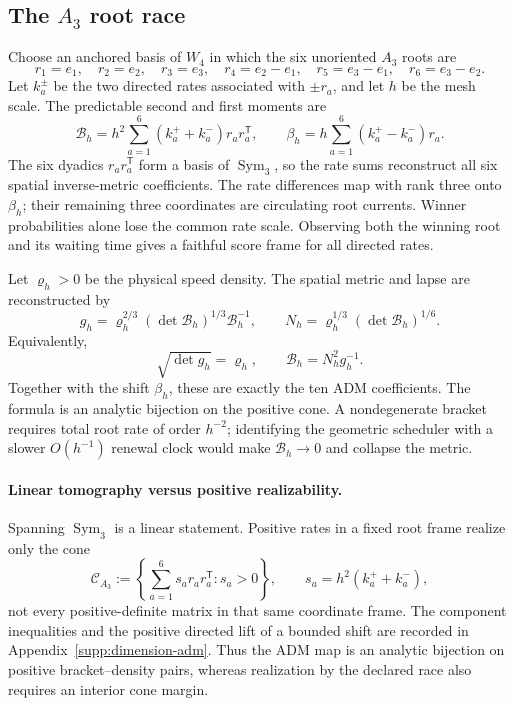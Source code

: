 \documentclass[11pt]{article}
\numberwithin{equation}{section}
\theoremstyle{definition}
\theoremstyle{remark}
\newcommand{\Sym}{\operatorname{Sym}}
\begin{document}
\subsection{The \texorpdfstring{$A_3$}{A3} root race}

Choose an anchored basis of $W_4$ in which the six unoriented $A_3$ roots are
\begin{equation}
 r_1=e_1,\quad r_2=e_2,\quad r_3=e_3,\quad
 r_4=e_2-e_1,\quad r_5=e_3-e_1,\quad r_6=e_3-e_2.
 \label{eq:a3-roots-main}
\end{equation}
Let $k_a^\pm$ be the two directed rates associated with $\pm r_a$, and let $h$
be the mesh scale.  The predictable second and first moments are
\begin{equation}
 \mathcal B_h
 =h^2\sum_{a=1}^{6}(k_a^++k_a^-)r_ar_a^{\mathsf T},
 \qquad
 \beta_h
 =h\sum_{a=1}^{6}(k_a^+-k_a^-)r_a.
 \label{eq:bracket-drift-main}
\end{equation}
The six dyadics $r_ar_a^{\mathsf T}$ form a basis of $\Sym_3$, so the rate sums
reconstruct all six spatial inverse-metric coefficients.  The rate differences
map with rank three onto $\beta_h$; their remaining three coordinates are
circulating root currents.  Winner probabilities alone lose the common rate
scale.  Observing both the winning root and its waiting time gives a faithful
score frame for all directed rates.

Let $\varrho_h>0$ be the physical speed density.  The spatial metric and lapse
are reconstructed by
\begin{equation}
 \boxed{
 g_h=\varrho_h^{2/3}(\det\mathcal B_h)^{1/3}\mathcal B_h^{-1},
 \qquad
 N_h=\varrho_h^{1/3}(\det\mathcal B_h)^{1/6}.}
 \label{eq:adm-inversion-main}
\end{equation}
Equivalently,
\begin{equation}
 \sqrt{\det g_h}=\varrho_h,
 \qquad
 \mathcal B_h=N_h^2g_h^{-1}.
 \label{eq:adm-forward-main}
\end{equation}
Together with the shift $\beta_h$, these are exactly the ten ADM coefficients.
The formula is an analytic bijection on the positive cone.  A nondegenerate
bracket requires total root rate of order $h^{-2}$; identifying the geometric
scheduler with a slower $O(h^{-1})$ renewal clock would make
$\mathcal B_h\to0$ and collapse the metric.

\paragraph{Linear tomography versus positive realizability.}
Spanning $\Sym_3$ is a linear statement. Positive rates in a fixed root frame
realize only the cone
\begin{equation}
 \mathcal C_{A_3}:=\left\{\sum_{a=1}^6s_ar_ar_a^{\mathsf T}:s_a>0\right\},
 \qquad s_a=h^2(k_a^++k_a^-),
 \label{eq:main-root-positive-cone}
\end{equation}
not every positive-definite matrix in that same coordinate frame.
The component inequalities and the positive directed lift of a bounded
shift are recorded in Appendix~\ref{supp:dimension-adm}. Thus the ADM
map is an analytic bijection on positive bracket--density pairs, whereas
realization by the declared race also requires an interior cone margin.
\end{document}
